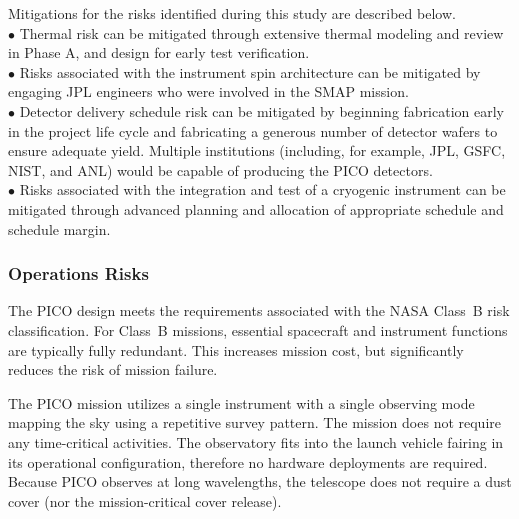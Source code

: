 Mitigations for %
the risks identified during this study are described below. \\
$\bullet$ \hspace{0.05in} Thermal risk can be mitigated through extensive thermal modeling and
review in Phase A, and design for early test verification. \\
$\bullet$ \hspace{0.05in} Risks associated with the instrument spin architecture can be mitigated by engaging JPL engineers who were involved in the SMAP mission. \\
$\bullet$ \hspace{0.05in} Detector delivery schedule risk can be mitigated by beginning fabrication early in the project life cycle and fabricating a generous number of detector wafers to ensure adequate yield. Multiple institutions (including, for example, JPL, GSFC, NIST, and ANL) would be capable of producing the PICO detectors. \\
$\bullet$ \hspace{0.05in} Risks associated with the integration and test of a cryogenic instrument can be mitigated through advanced planning and allocation of appropriate schedule and schedule margin.

\subsubsection{Operations Risks}
\label{sec:operations_risks} %
 

The PICO design meets the requirements associated with the NASA Class~B risk classification. For Class~B missions, essential spacecraft and instrument functions are typically fully redundant. This increases mission cost, but significantly reduces the risk of mission failure.

The PICO mission utilizes a single instrument with a single observing mode mapping the sky using a repetitive survey pattern. The mission does not require any time-critical activities. The observatory fits into 
the launch vehicle fairing in its operational configuration, therefore no hardware deployments are required. 
Because PICO observes at long wavelengths, the telescope does not require a dust cover (nor the %
 mission-critical cover release).


